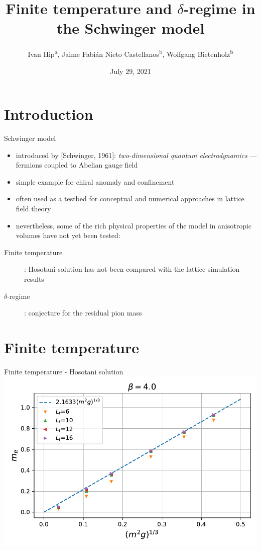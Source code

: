 \documentclass[english]{beamer}
\title{Finite temperature and $\delta$-regime in the Schwinger model}
\author{
  Ivan Hip\textsuperscript{a},
  Jaime Fabián Nieto Castellanos\textsuperscript{b},
  Wolfgang Bietenholz\textsuperscript{b}}
\institute{
  \textsuperscript{a}University of Zagreb, Croatia\\
  \textsuperscript{b}UNAM, Mexico
}
\date{July 29, 2021}
\begin{document}
 
\begin{frame}
  \titlepage
\end{frame}

\section{Introduction}

\begin{frame}{Schwinger model}
  \begin{itemize}
    \item introduced by [Schwinger, 1961]:
      \textit{two-dimensional quantum electrodynamics}
      --- fermions coupled to Abelian gauge field 
    \item simple example for chiral anomaly and confinement
    \item often used as a testbed for conceptual and numerical
approaches in lattice field theory
    \item nevertheless, some of the rich physical
properties of the model in anisotropic volumes have not yet been tested:
  \end{itemize}
  \begin{description}
    \item[Finite temperature]:
      Hosotani solution has not been compared with the lattice
      simulation results
    \item[$\delta$-regime]: conjecture for the residual pion mass
  \end{description}
\end{frame}

\section{Finite temperature}

\begin{frame}{Finite temperature - Hosotani solution}
  \includegraphics[width=1\textwidth]{figs/FiniteTMPiHos}
\end{frame}
\end{document}
